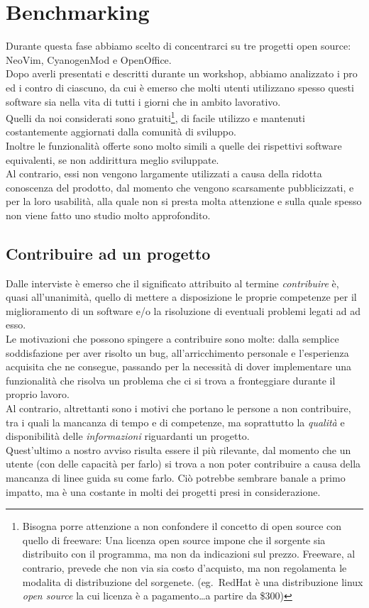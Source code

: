 \documentclass[12pt]{article} %
\begin{document}
\newpage

\section{Benchmarking}
Durante questa fase abbiamo scelto di concentrarci su tre progetti open source: NeoVim, CyanogenMod e OpenOffice.\\
Dopo averli presentati e descritti durante un workshop, abbiamo analizzato i pro ed i contro di ciascuno, da cui \`e emerso che molti utenti utilizzano spesso questi software sia nella vita di tutti i giorni che in ambito lavorativo.\\
Quelli da noi considerati sono gratuiti\footnote{Bisogna porre attenzione a non confondere il concetto di open source con quello di freeware: Una licenza open source impone che il sorgente sia distribuito con il programma, ma non da indicazioni sul prezzo. Freeware, al contrario, prevede che non via sia costo d'acquisto, ma non regolamenta le modalita di distribuzione del sorgenete. (eg.\ RedHat \`e una distribuzione linux \emph{open source} la cui licenza \`e a pagamento\dots a partire da \$300)}, di facile utilizzo e mantenuti costantemente aggiornati dalla comunit\`a di sviluppo.\\
Inoltre le funzionalit\`a offerte sono molto simili a quelle dei rispettivi software equivalenti, se non addirittura meglio sviluppate.\\
Al contrario, essi non vengono largamente utilizzati a causa della ridotta conoscenza del prodotto, dal momento che vengono scarsamente pubblicizzati, e per la loro usabilit\`a, alla quale non si presta molta attenzione e sulla quale spesso non viene fatto uno studio molto approfondito.\\

\subsection{Contribuire ad un progetto}
\label{motivi}
Dalle interviste \`e emerso che il significato attribuito al termine \emph{contribuire} \`e, quasi all'unanimit\`a, quello di mettere a disposizione le proprie competenze per il miglioramento di un software e/o la risoluzione di eventuali problemi legati ad ad esso.\\
Le motivazioni che possono spingere a contribuire sono molte: dalla semplice soddisfazione per aver risolto un bug, all'arricchimento personale e l'esperienza acquisita che ne consegue, passando per la necessit\`a di dover implementare una funzionalit\`a che risolva un problema che ci si trova a fronteggiare durante il proprio lavoro.\\
Al contrario, altrettanti sono i motivi che portano le persone a non contribuire, tra i quali la mancanza di tempo e di competenze, ma soprattutto la \emph{qualit\`a} e disponibilit\`a delle \emph{informazioni} riguardanti un progetto.\\
Quest'ultimo a nostro avviso risulta essere il pi\`u rilevante, dal momento che un utente (con delle capacit\`a per farlo) si trova a non poter contribuire a causa della mancanza di linee guida su come farlo. Ci\`o potrebbe sembrare banale a primo impatto, ma \`e una costante in molti dei progetti presi in considerazione.
\end{document}
